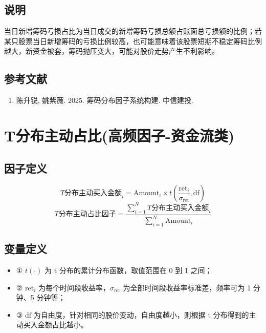 \documentclass{article}
\begin{document}
\subsection{说明}
当日新增筹码亏损占比为当日成交的新增筹码亏损总额占账面总亏损额的比例；若某只股票当日新增筹码的亏损比例较高，也可能意味着该股票短期不稳定筹码比例越大，新资金被套，筹码抛压变大，可能对股价走势产生不利影响。

\subsection{参考文献}
\begin{enumerate}
    \item 陈升锐, 姚紫薇. 2025. 筹码分布因子系统构建. 中信建投.
\end{enumerate}

\section{T分布主动占比(高频因子-资金流类)}

\subsection{因子定义}

\begin{equation}
    T \text{分布主动买入金额}_i = \mathrm{Amount}_i \times t\left(\frac{\mathrm{ret}_i}{\sigma_{\mathrm{ret}}}, \mathrm{df}\right)
\end{equation}
\begin{equation}
    T \text{分布主动占比因子} = \frac{\sum_{i=1}^{N} T \text{分布主动买入金额}_i}{\sum_{i=1}^{N} \mathrm{Amount}_i}
\end{equation}

\subsection{变量定义}
\begin{itemize}
    \item ① \( t(\cdot) \) 为 t 分布的累计分布函数，取值范围在 0 到 1 之间；
    \item ② \( \mathrm{ret}_i \) 为每个时间段收益率，\( \sigma_{\mathrm{ret}} \) 为全部时间段收益率标准差，频率可为 1 分钟、5 分钟等；
    \item ③ \( \mathrm{df} \) 为自由度，针对相同的股价变动，自由度越小，则根据 t 分布得到的主动买入金额占比越小。
\end{itemize}
\end{document}
